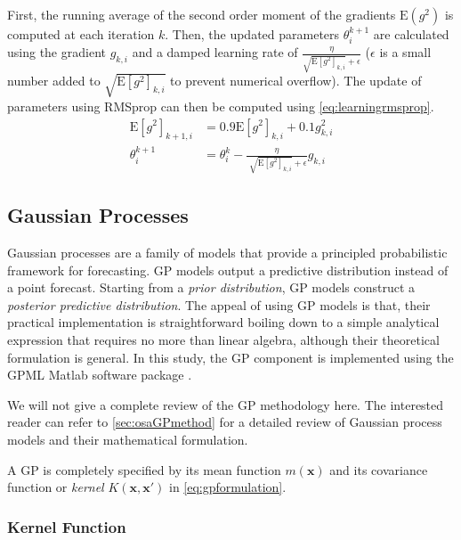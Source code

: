 First, the running average of the second order moment of the gradients 
$\mathrm{E} \left( g^{2} \right)$ is computed at each iteration $k$. Then, the updated parameters 
$\theta^{k+1}_{i}$ are calculated using the gradient $g_{k,i}$ and a damped learning rate of 
$\frac{\eta}{\sqrt{\mathrm{E} \left[ g^{2} \right]_{k,i}} + \epsilon }$ ($\epsilon$ is a small 
number added to $\sqrt{\mathrm{E} \left[ g^{2} \right]_{k,i}}$ to prevent numerical overflow). The 
update of parameters using RMSprop can then be computed using \cref{eq:learningrmsprop}.
%
\begin{align}\label{eq:learningrmsprop}
 \mathrm{E} \left[ g^{2} \right]_{k+1,i} &= 0.9 \mathrm{E} \left[ g^{2} \right]_{k,i} + 0.1 g_{k,i}^{2}  \\ 
 \theta^{k+1}_{i} &= \theta^{k}_{i} - \frac{ \eta }{\sqrt[]{\mathrm{E} \left[ g^{2} \right]_{k,i}} + \epsilon } g_{k,i}
\end{align}

\subsection{Gaussian Processes}\label{sec:gpcomponent}

Gaussian processes are a family of models that provide a principled probabilistic framework for 
forecasting. GP models output a predictive distribution instead of a point forecast. Starting from 
a \emph{prior distribution}, GP models construct a \emph{posterior predictive distribution}. The 
appeal of using GP models is that, their practical implementation is straightforward boiling down 
to a simple analytical expression that requires no more than linear algebra, although their 
theoretical formulation is general. In this study, the GP component is implemented using the GPML 
Matlab software package \citep{rasmussen2010gaussian}. 

We will not give a complete review of the GP methodology here. The interested reader can refer to 
\cref{sec:osaGPmethod} for a detailed review of Gaussian process models and their 
mathematical formulation.

A GP is completely specified by its mean function  $m \left( \mathbf{x} \right)$ and its covariance 
function or \emph{kernel} $K (\mathbf{x}, \mathbf{x}')$ in \cref{eq:gpformulation}.

\subsubsection*{Kernel Function}

